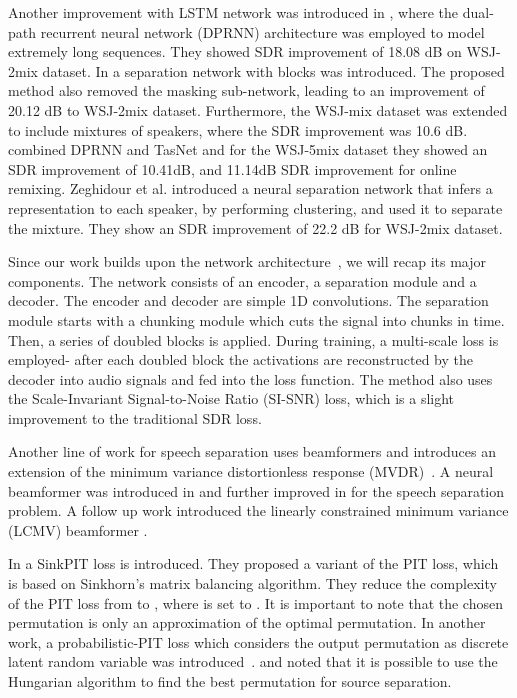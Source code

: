 \documentclass[a4paper]{article}
\begin{document}
Another improvement with LSTM network was introduced in \cite{luo2019dual}, where the dual-path recurrent neural network (DPRNN) architecture was employed to model extremely long sequences. They showed SDR improvement of 18.08 dB on WSJ-2mix dataset. In \cite{nachmani2020voice} a separation network with  blocks was introduced. The proposed method also removed the masking sub-network, leading to an improvement of 20.12 dB to WSJ-2mix dataset. Furthermore, the WSJ-mix dataset was extended to include mixtures of  speakers, where the SDR improvement was 10.6 dB. \cite{shi2020toward} combined DPRNN and TasNet and for the WSJ-5mix dataset they showed an SDR improvement of 10.41dB, and 11.14dB SDR improvement for online remixing. Zeghidour et al. \cite{zeghidour2020wavesplit} introduced a neural separation network that infers a representation to each speaker, by performing clustering, and used it to separate the mixture. They show an SDR improvement of 22.2 dB for WSJ-2mix dataset. 

Since our work builds upon the  network architecture~\cite{nachmani2020voice}, we will recap its major components. The network consists of an encoder, a separation module and a decoder. The encoder and decoder are simple 1D convolutions. The separation module starts with a chunking module which cuts the signal into chunks in time. Then, a series of doubled  blocks is applied. During training, a multi-scale loss is employed- after each doubled  block the activations are reconstructed by the decoder into audio signals and fed into the loss function. The method also uses the Scale-Invariant Signal-to-Noise Ratio (SI-SNR) loss, which is a slight improvement to the traditional SDR loss.

Another line of work for speech separation uses beamformers and introduces an extension of the minimum variance distortionless response (MVDR)~\cite{markovich2009multichannel}. A neural beamformer was introduced in \cite{sainath2015speaker} and further improved in \cite{luo2019fasnet} for the speech separation problem. A follow up work introduced the linearly constrained minimum variance (LCMV) beamformer \cite{laufer2020global}. 

In \cite{tachibana2020towards} a SinkPIT loss is introduced. They proposed a variant of the PIT loss, which is based on Sinkhorn’s matrix balancing algorithm. They reduce the complexity of the PIT loss from  to , where  is set to . It is important to note that the chosen permutation is only an approximation of the optimal permutation. In another work, a probabilistic-PIT loss which considers the output permutation as discrete latent random variable was introduced~\cite{yousefi2019probabilistic}. \cite{kanda2020serialized} and \cite{ma2020monaural} noted that it is possible to use the Hungarian algorithm to find the best permutation for source separation.
\end{document}

